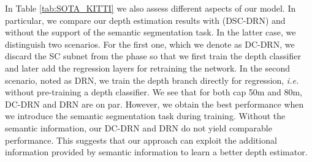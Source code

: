 \documentclass[letterpaper, 10 pt, conference]{ieeeconf}
\newcommand{\ie}{{\em i.e.}}
\newcommand{\Tab}[1]{Table \ref{tab:#1}}
\begin{document}
In \Tab{SOTA_KITTI} we also assess different aspects of our model. In particular, we compare our depth estimation results with (DSC-DRN) and without the support of the semantic segmentation task. In the latter case, we distinguish two scenarios. For the first one, which we denote as DC-DRN, we discard the SC subnet from the  phase so that we first train the depth classifier and later add the regression layers for retraining the network. In the second scenario, noted as DRN, we train the depth branch directly for regression, {\ie} without pre-training a depth classifier. We see that for both cap 50m and 80m, DC-DRN and DRN are on par. However, we obtain the best performance when we introduce the semantic segmentation task during training. Without the semantic information, our DC-DRN and DRN do not yield comparable performance. This suggests that our approach can exploit the additional information provided by semantic information to learn a better depth estimator.


\newcommand{\commentA}{}

\renewrobustcmd{\boldmath}{}
\newrobustcmd{\B}{\bfseries}
\newrobustcmd{\IL}{\itshape}
\addtolength{\tabcolsep}{-4.1pt}
\end{document}

